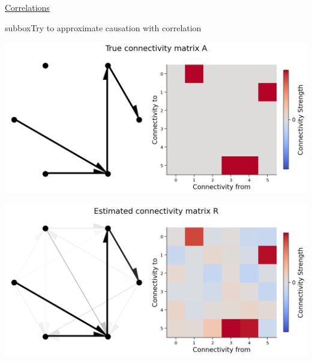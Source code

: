 \begin{textbox}{\href{https://compneuro.neuromatch.io/tutorials/W3D5_NetworkCausality/student/W3D5_Tutorial2.html}{Correlations }   }
\begin{subbox}{subbox}{Try to approximate causation with correlation}
\begin{center}
\includegraphics[scale=0.2]{Figures/NC/NC_Figure9.png}
    
\includegraphics[scale=0.2]{Figures/NC/NC_Figure10.png}
\end{center}
\end{subbox}
\end{textbox}
